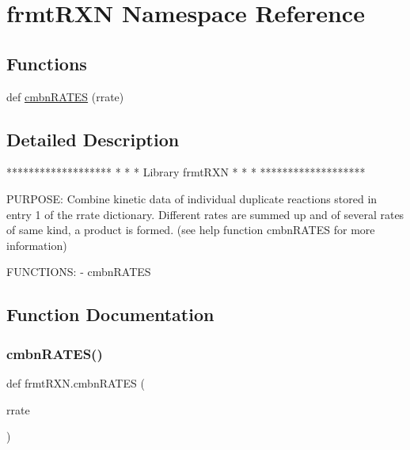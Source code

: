 \hypertarget{namespacefrmtRXN}{}\section{frmt\+R\+XN Namespace Reference}
\label{namespacefrmtRXN}
\subsection*{Functions}
\begin{DoxyCompactItemize}
\item 
def \mbox{\hyperlink{namespacefrmtRXN_a40c945405cd95499b80af8b3b31a508a}{cmbn\+R\+A\+T\+ES}} (rrate)
\end{DoxyCompactItemize}


\subsection{Detailed Description}
\begin{DoxyVerb}*******************
*                 *
* Library frmtRXN *
*                 *
*******************

PURPOSE:
Combine kinetic data of individual duplicate reactions
stored in entry 1 of the rrate dictionary. Different rates
are summed up and of several rates of same kind, a product
is formed. (see help function cmbnRATES for more information)

FUNCTIONS:
- cmbnRATES
\end{DoxyVerb}
 

\subsection{Function Documentation}
\mbox{\label{namespacefrmtRXN_a40c945405cd95499b80af8b3b31a508a}} 
\subsubsection{\texorpdfstring{cmbn\+R\+A\+T\+E\+S()}{cmbnRATES()}}
{\footnotesize\ttfamily def frmt\+R\+X\+N.\+cmbn\+R\+A\+T\+ES (\begin{DoxyParamCaption}\item[{}]{rrate }\end{DoxyParamCaption})}

